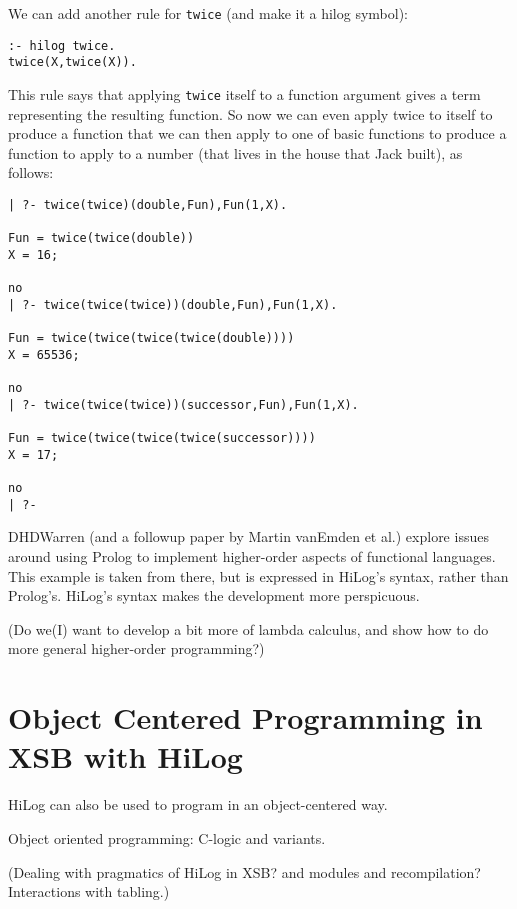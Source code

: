 We can add another rule for \verb|twice| (and make it a hilog symbol):
\begin{verbatim}
:- hilog twice.
twice(X,twice(X)).
\end{verbatim}
This rule says that applying \verb|twice| itself to a function
argument gives a term representing the resulting function.  So now we
can even apply twice to itself to produce a function that we can then
apply to one of basic functions to produce a function to apply to a
number (that lives in the house that Jack built), as follows:
\begin{verbatim}
| ?- twice(twice)(double,Fun),Fun(1,X).

Fun = twice(twice(double))
X = 16;

no
| ?- twice(twice(twice))(double,Fun),Fun(1,X).

Fun = twice(twice(twice(twice(double))))
X = 65536;

no
| ?- twice(twice(twice))(successor,Fun),Fun(1,X).

Fun = twice(twice(twice(twice(successor))))
X = 17;

no
| ?- 
\end{verbatim}

DHDWarren (and a followup paper by Martin vanEmden et al.) explore
issues around using Prolog to implement higher-order aspects of
functional languages.  This example is taken from there, but is
expressed in HiLog's syntax, rather than Prolog's.  HiLog's syntax
makes the development more perspicuous.

(Do we(I) want to develop a bit more of lambda calculus, and show how
to do more general higher-order programming?)

\section{Object Centered Programming in XSB with HiLog}

HiLog can also be used to program in an object-centered way.






Object oriented programming: C-logic and variants.

(Dealing with pragmatics of HiLog in XSB? and modules and
recompilation? Interactions with tabling.)

